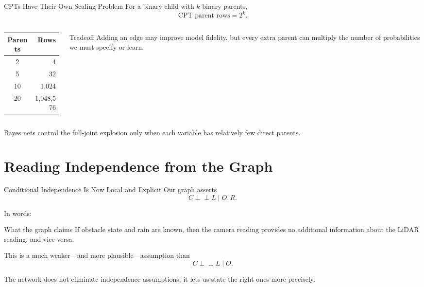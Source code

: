 \documentclass[aspectratio=169,10pt]{beamer}
\begin{document}
\begin{frame}[shrink=10]{CPTs Have Their Own Scaling Problem}
  For a binary child with $k$ binary parents,
  \[
    \text{CPT parent rows}=2^k.
  \]

  \begin{columns}[T,onlytextwidth]
    \begin{column}{0.40\textwidth}
      \begin{center}
      \begin{tabular}{c|r}
        \textbf{Parents} & \textbf{Rows} \\\hline
        2 & 4 \\
        5 & 32 \\
        10 & 1,024 \\
        20 & 1,048,576
      \end{tabular}
      \end{center}
    \end{column}
    \begin{column}{0.52\textwidth}
      \begin{block}{Tradeoff}
        Adding an edge may improve model fidelity, but every extra parent can multiply the number of probabilities we must specify or learn.
      \end{block}
    \end{column}
  \end{columns}

  \begin{keyidea}
    Bayes nets control the full-joint explosion only when each variable has relatively few direct parents.
  \end{keyidea}
\end{frame}

\section{Reading Independence from the Graph}

\begin{frame}[shrink=10]{Conditional Independence Is Now Local and Explicit}
  Our graph asserts
  \[
    C\perp\!\!\!\perp L\mid O,R.
  \]

  In words:
  \begin{block}{What the graph claims}
    If obstacle state and rain are known, then the camera reading provides no additional information about the LiDAR reading, and vice versa.
  \end{block}

  This is a much weaker---and more plausible---assumption than
  \[
    C\perp\!\!\!\perp L\mid O.
  \]

  \begin{keyidea}
    The network does not eliminate independence assumptions; it lets us state the right ones more precisely.
  \end{keyidea}
\end{frame}
\end{document}
